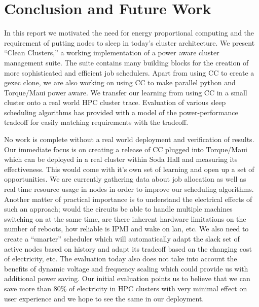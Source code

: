 \section{Conclusion and Future Work} %
\label{sec:conclusion_and_future_work}
In this report we motivated the need for energy proportional computing and the requirement of putting nodes to sleep in today's cluster architecture. We present ``Clean Clusters,'' a working implementation of a power aware cluster management suite. The suite contains many building blocks for the creation of more sophisticated and efficient job schedulers. Apart from using CC to create a gexec clone, we are also working on using CC to make parallel python and Torque/Maui power aware. We transfer our learning from using CC in a small cluster onto a real world HPC cluster trace. Evaluation of various sleep scheduling algorithms has provided with a model of the power-performance tradeoff for easily matching requirements with the tradeoff. 

No work is complete without a real world deployment and verification of results. Our immediate focus is on creating a release of CC plugged into Torque/Maui which can be deployed in a real cluster within Soda Hall and measuring its effectiveness. This would come with it's own set of learning and open up a set of opportunities. We are currently gathering data about job allocation as well as real time resource usage in nodes in order to improve our scheduling algorithms. Another matter of practical importance is to understand the electrical effects of such an approach; would the circuits be able to handle multiple machines switching on at the same time, are there inherent hardware limitations on the number of reboots, how reliable is IPMI and wake on lan, etc. We also need to create a ``smarter'' scheduler which will automatically adapt the slack set of active nodes based on history and adapt its tradeoff based on the changing cost of electricity, etc. The evaluation today also does not take into account the benefits of dynamic voltage and frequency scaling which could provide us with additional power saving. Our initial evaluation points us to believe that we can save more than 80\% of electricity in HPC clusters with very minimal effect on user experience and we hope to see the same in our deployment.
